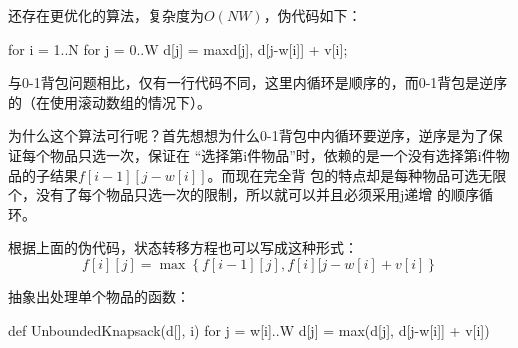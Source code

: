 还存在更优化的算法，复杂度为$O(NW)$，伪代码如下：
\begin{Code}
for i = 1..N
    for j = 0..W
        d[j] = max{d[j], d[j-w[i]] + v[i]};
\end{Code}

与0-1背包问题相比，仅有一行代码不同，这里内循环是顺序的，而0-1背包是逆序的（在使用滚动数组的情况下）。

为什么这个算法可行呢？首先想想为什么0-1背包中内循环要逆序，逆序是为了保证每个物品只选一次，保证在
“选择第i件物品”时，依赖的是一个没有选择第i件物品的子结果$f[i-1][j-w[i]]$。而现在完全背
包的特点却是每种物品可选无限个，没有了每个物品只选一次的限制，所以就可以并且必须采用j递增
的顺序循环。

根据上面的伪代码，状态转移方程也可以写成这种形式：
$$f[i][j]=\max\left\{f[i-1][j], f[i][j-w[i]+v[i]\right\}$$

抽象出处理单个物品的函数：
\begin{Code}
def UnboundedKnapsack(d[], i)
    for j = w[i]..W
        d[j] = max(d[j], d[j-w[i]] + v[i])
\end{Code}

